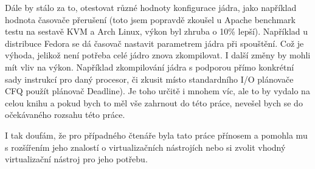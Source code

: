 Dále by stálo za to, otestovat různé hodnoty konfigurace jádra, jako například hodnota časovače přerušení (toto jsem popravdě zkoušel u Apache benchmark testu na sestavě KVM a Arch Linux, výkon byl zhruba o 10\% lepší). Například u distribuce Fedora se dá časovač nastavit parametrem jádra při spouštění. Což je výhoda, jelikož není potřeba celé jádro znova zkompilovat. I další změny by mohli mít vliv na výkon. Například zkompilování jádra s podporou přímo konkrétní sady instrukcí pro daný procesor, či zkusit místo standardního I/O plánovače CFQ použít plánovač Deadline). Je toho určitě i mnohem víc, ale to by vydalo na celou knihu a pokud bych to měl vše zahrnout do této práce, nevešel bych se do očekávaného rozsahu této práce.

I tak doufám, že pro případného čtenáře byla tato práce přínosem a pomohla mu s rozšířením jeho znalostí o virtualizačních nástrojích nebo si zvolit vhodný virtualizační nástroj pro jeho potřebu. \cite{dike:uml}
\cite{hagen:xen} \cite{huynh:kvm} \cite{kivity:kvm} \cite{romero:vbox} \cite{ruest:virt} \cite{wiki:ovz}
